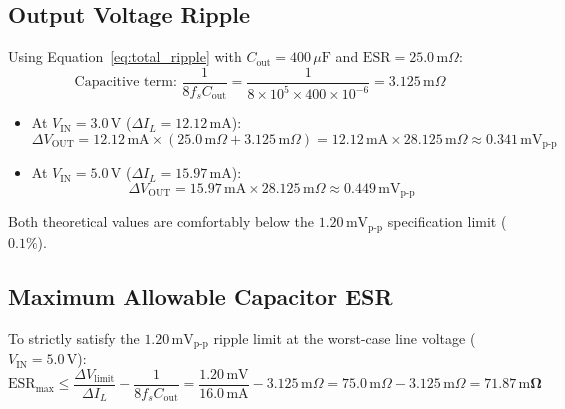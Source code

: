 \documentclass[12pt,a4paper]{article}
\newcommand{\Vout}{V_{\mathrm{OUT}}}
\newcommand{\Vin}{V_{\mathrm{IN}}}
\newcommand{\dI}{\Delta I_L}
\newcommand{\fs}{f_s}
\newcommand{\ESR}{\mathrm{ESR}}
\begin{document}
\subsection{Output Voltage Ripple}
Using Equation~\eqref{eq:total_ripple} with $C_{\mathrm{out}} = 400\,\mu\mathrm{F}$ and $\ESR = 25.0\,\mathrm{m}\Omega$:
\begin{equation*}
    \text{Capacitive term: } \frac{1}{8 \fs C_{\mathrm{out}}} = \frac{1}{8 \times 10^5 \times 400\times 10^{-6}} = 3.125\,\mathrm{m}\Omega
\end{equation*}
\begin{itemize}
    \item At $\Vin = 3.0\,\mathrm{V}$ ($\dI = 12.12\,\mathrm{mA}$):
    \begin{equation*}
        \Delta \Vout = 12.12\,\mathrm{mA} \times (25.0\,\mathrm{m}\Omega + 3.125\,\mathrm{m}\Omega) = 12.12\,\mathrm{mA} \times 28.125\,\mathrm{m}\Omega \approx \mathbf{0.341\,\mathrm{mV}_{\mathrm{p\text{-}p}}}
    \end{equation*}
    \item At $\Vin = 5.0\,\mathrm{V}$ ($\dI = 15.97\,\mathrm{mA}$):
    \begin{equation*}
        \Delta \Vout = 15.97\,\mathrm{mA} \times 28.125\,\mathrm{m}\Omega \approx \mathbf{0.449\,\mathrm{mV}_{\mathrm{p\text{-}p}}}
    \end{equation*}
\end{itemize}
Both theoretical values are comfortably below the $1.20\,\mathrm{mV}_{\mathrm{p\text{-}p}}$ specification limit ($0.1\%$).

\subsection{Maximum Allowable Capacitor ESR}
To strictly satisfy the $1.20\,\mathrm{mV}_{\mathrm{p\text{-}p}}$ ripple limit at the worst-case line voltage ($\Vin = 5.0\,\mathrm{V}$):
\begin{equation}
    \ESR_{\mathrm{max}} \le \frac{\Delta V_{\mathrm{limit}}}{\dI} - \frac{1}{8 \fs C_{\mathrm{out}}} = \frac{1.20\,\mathrm{mV}}{16.0\,\mathrm{mA}} - 3.125\,\mathrm{m}\Omega = 75.0\,\mathrm{m}\Omega - 3.125\,\mathrm{m}\Omega = \mathbf{71.87\,\mathrm{m}\Omega}
\end{equation}
\end{document}
